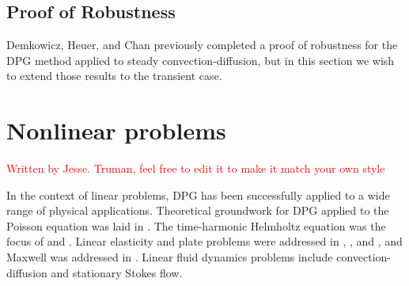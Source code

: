 \documentclass[preprint,12pt]{elsarticle}
\begin{document}
\subsection{Proof of Robustness}
Demkowicz, Heuer, and Chan\cite{DemkowiczHeuer, ChanHeuerThanhDemkowicz2012} previously completed a proof of robustness 
for the DPG method applied to steady convection-diffusion, but in this section we wish to extend those results to the transient case.



\section{Nonlinear problems}

\textcolor{red}{Written by Jesse. Truman, feel free to edit it to make it match your own style}

In the context of linear problems, DPG has been successfully applied to a wide range of physical applications.  
Theoretical groundwork for DPG applied to the Poisson equation was laid in \cite{DPGPoisson}.  The time-harmonic Helmholtz equation was the focus of \cite{DPGHelmholtz, Gopalakrishnan2014} and \cite{DPG4}.  Linear elasticity and plate problems were addressed in \cite{BramwellDPG}, \cite{NiemiBramwellDemkowicz10}, and \cite{BramwellDemkowiczQiu10}, and Maxwell was addressed in \cite{DPGCloaking, WohlmuthReport}.  Linear fluid dynamics problems include convection-diffusion\cite{DPG3,DemkowiczHeuer,ChanHeuerThanhDemkowicz2012,Chan2013,EllisLC} and stationary Stokes flow\cite{DPGStokes,EllisLC}.
\end{document}
